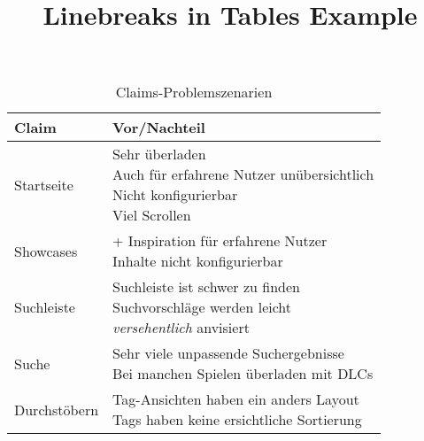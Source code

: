 \documentclass[11pt,a4paper]{scrartcl}
\title{Linebreaks in Tables Example}
\begin{document}
\makeatletter
{\LARGE \textbf{\@title}}
\makeatother
\vspace{2.5em}


\begin{table}[ht]\centering
    \begin{tabular}{ll}
        Claim       & Vor/Nachteil                                                                                                                                                      \\\midrule
        Startseite  & \makecell[l]{\textminus{} Sehr überladen\\\textminus{} Auch für erfahrene Nutzer unübersichtlich\\\textminus{} Nicht konfigurierbar\\\textminus{} Viel Scrollen}  \\\addlinespace
        Showcases   & \makecell[l]{+ Inspiration für erfahrene Nutzer\\\textminus{} Inhalte nicht konfigurierbar}                                                                       \\\addlinespace
        Suchleiste  & \makecell[l]{\textminus{} Suchleiste ist schwer zu finden\\\textminus{} Suchvorschläge werden leicht\\\textit{versehentlich} anvisiert}                           \\\addlinespace
        Suche       & \makecell[l]{\textminus{} Sehr viele unpassende Suchergebnisse\\\textminus{} Bei manchen Spielen überladen mit DLCs}                                              \\\addlinespace
        Durchstöbern& \makecell[l]{\textminus{} Tag-Ansichten haben ein anders Layout\\\textminus{} Tags haben keine ersichtliche Sortierung}                                           \\
    \end{tabular}
    \caption{Claims-Problemszenarien}\label{tab:claims-problemszenarien}
\end{table}
\end{document}
